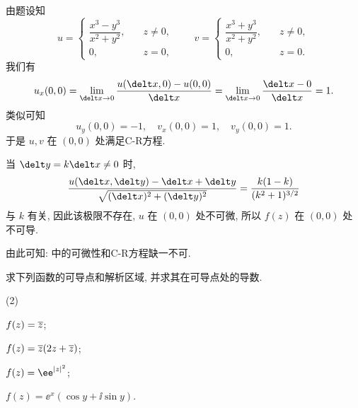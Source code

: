 \begin{solution}
  由题设知
  \[
    u=\begin{cases}
        \dfrac{x^3-y^3}{x^2+y^2},\quad &z\neq 0,\\
        0,&z=0,
      \end{cases}\qquad
    v=\begin{cases}
        \dfrac{x^3+y^3}{x^2+y^2},\quad &z\neq 0,\\
        0,&z=0.
      \end{cases}
  \]
  我们有
  \[
     u_x(0,0)
    =\lim_{\delt x\ra 0}\frac{u(\delt x,0)-u(0,0)}{\delt x}
    =\lim_{\delt x\ra 0}\frac{\delt x-0}{\delt x}=1.
  \]
  类似可知
  \[
    u_y(0,0)=-1,\quad
    v_x(0,0)=1,\quad
    v_y(0,0)=1.
  \]
  于是 $u,v$ 在 $(0,0)$ 处满足C-R方程.

  当 $\delt y=k\delt x\neq 0$ 时,
  \[
     \frac{u(\delt x,\delt y)-\delt x+\delt y}{\sqrt{(\delt x)^2+(\delt y)^2}}
    =\frac{k(1-k)}{(k^2+1)^{3/2}}
  \]
  与 $k$ 有关, 因此该极限不存在, $u$ 在 $(0,0)$ 处不可微, 所以 $f(z)$ 在 $(0,0)$ 处不可导.
\end{solution}

由此可知:
  \alert{\thmCR 中的可微性和C-R方程缺一不可.}

\begin{example}
  求下列函数的可导点和解析区域, 并求其在可导点处的导数.
  \begin{subexample}(2)
    \item $f(z)=\overline z$;
    \item $f(z)=\overline z(2z+\overline z)$;
    \item $f(z)=\ee^{\abs{z}^2}$;
    \item $f(z)=\ee^x(\cos y+\ii\sin y)$.
    \label{enum:exp}
  \end{subexample}
\end{example}

